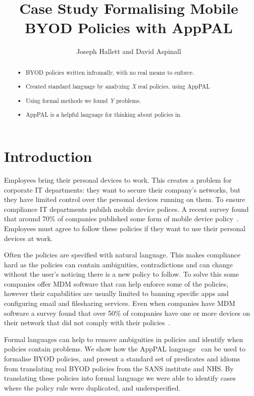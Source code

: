 \documentclass[a4paper]{article}
\title{Case Study Formalising Mobile BYOD Policies with AppPAL}
\author{Joseph Hallett and David Aspinall}
\begin{document}
\maketitle

\begin{abstract}
  \begin{itemize}
  \item BYOD policies written infromally, with no real means to enforce.
  \item Created standard language by analyzing \emph{X} real policies, using AppPAL
  \item Using formal methods we found \emph{Y} problems.
  \item AppPAL is a helpful language for thinking about policies in. 
  \end{itemize}
\end{abstract}

\section{Introduction}
\label{sec:intro}

Employees bring their personal devices to work.
This creates a problem for corporate IT departments:
  they want to secure their company's networks, but they have limited control over the personal devices running on them.
To ensure compliance IT departments pubilsh mobile device polices.
A recent survey found that around 70\% of companies published some form of mobile device policy~\cite{schulze_byod_2016}.
Employees must agree to follow these policies if they want to use their personal devices at work.

Often the policies are specified with natural language.
This makes compliance hard as the policies can contain ambiguities, contradictions and can change without the user's noticing there is a new policy to follow.
To solve this some companies offer \ac{MDM} software that can help enforce some of the policies, however their capabilities are usually limited to banning specific apps and configuring email and filesharing services.
Even when companies have \ac{MDM} software a survey found that over 50\% of companies have one or more devices on their network that did not comply with their policies~\cite{mobileiron_security_labs_q4_2015}.

Formal languages can help to remove ambiguities in policies and identify when policies contain problems.
We show how the AppPAL language~\cite{hallett_apppal_2016} can be used to formalise \ac{BYOD} policies, and present a standard set of predicates and idioms from translating real \ac{BYOD} policies from the SANS institute and NHS.
By translating these policies into formal language we were able to identify cases where the policy rule were duplicated, and underspecified.
\end{document}
